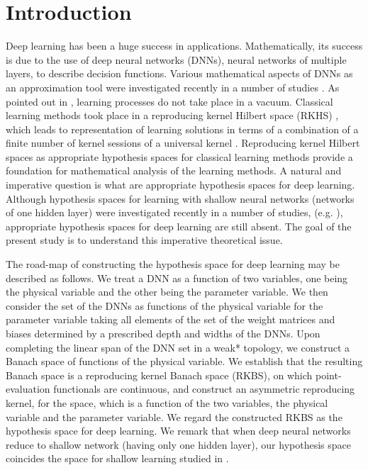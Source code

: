 \documentclass[11pt]{article}
\begin{document}
\section{Introduction}
Deep learning has been a huge success in applications. Mathematically, its success is due to the use of deep neural networks (DNNs), neural networks of multiple layers, to describe decision functions. 
Various mathematical aspects of DNNs as an approximation tool were investigated recently in a number of studies \cite{daubechies2022nonlinear, huang2022error,li2024two, mhaskar2016deep, shen2022optimal, xu2022convergence, xu2024convergence, zhou2020universality}.
As pointed out in \cite{cucker2002mathematical}, learning processes do not take place in a vacuum. Classical learning methods took place in a reproducing kernel Hilbert space (RKHS) \cite{Aronszajn1950theory}, which leads to representation of learning solutions in terms of a combination of a finite number of kernel sessions \cite{scholkopf2001generalized} of a universal kernel \cite{micchelli2006universal}. Reproducing kernel Hilbert spaces as appropriate hypothesis spaces for classical learning methods provide a foundation for mathematical analysis of the learning methods. A natural and imperative question is what are appropriate hypothesis spaces for deep learning. Although hypothesis spaces for learning with shallow neural networks (networks of one hidden layer) were investigated recently in a number of studies, (e.g. \cite{bartolucci2023understanding, chung2023barron, parhi2021banach, shenouda2023vector}),  appropriate hypothesis spaces for deep learning are still absent.
The goal of the present study is to understand this imperative theoretical issue. %

The road-map of constructing the hypothesis space for deep learning may be described as follows.
We treat a DNN as a function of two variables, one being the physical variable and the other being the parameter variable. We then consider the set of the DNNs as functions of the physical variable for the parameter variable taking all elements of the set of the weight matrices and biases determined by a prescribed depth and widths of the DNNs. Upon completing the linear span of the DNN set in a weak* topology, we construct a Banach space of functions of the physical variable. We establish that the resulting Banach space is a reproducing kernel Banach space (RKBS), on which point-evaluation functionals are continuous, and construct an asymmetric reproducing kernel, for the space, which is a function of the two variables, the physical variable and the parameter variable. We regard the constructed RKBS as the hypothesis space for deep learning. We remark that when deep neural networks reduce to shallow network (having only one hidden layer), our hypothesis space coincides the space for shallow learning studied in \cite{bartolucci2023understanding}.
\end{document}
